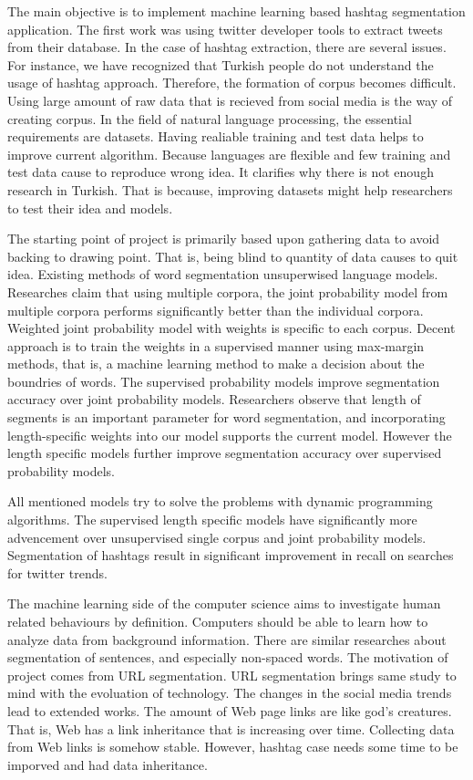 \documentclass[12pt]{comjnl}
\begin{document}
The main objective is to implement machine learning based hashtag segmentation application.
The first work was using twitter developer tools to 
extract tweets from their database. In the case of hashtag extraction, there are several issues. For instance,
we have recognized that Turkish people do not understand the usage of hashtag approach.
Therefore, the formation of corpus becomes difficult. Using large amount of raw data that 
is recieved from social media is the way of creating corpus. In the field of natural language 
processing, the essential requirements are datasets. Having realiable training and test data helps to improve
current algorithm. Because languages are flexible and few training and test data cause to 
reproduce wrong idea. It clarifies why there is not enough
research in Turkish. That is because, improving datasets might help researchers to test their idea and
models.

The starting point of project is primarily based upon gathering data to avoid
backing to drawing point. That is, being blind to quantity of data causes to quit idea.
Existing methods of word segmentation unsuperwised language models. Researches claim that
using multiple corpora, the joint probability model from multiple corpora performs significantly 
better than the individual corpora. Weighted joint probability model with weights is specific to each corpus. Decent approach is to train the weights in a supervised manner using max-margin methods, that is, a machine learning method to make a decision about the boundries of words.
The supervised probability models improve segmentation accuracy over joint probability models. 
Researchers observe that length of segments is an important parameter for word segmentation, and 
incorporating length-specific weights into our model supports the current model.
However the length specific models further improve segmentation accuracy over supervised 
probability models.

All mentioned models try to solve the problems with dynamic programming algorithms. The supervised length specific models have significantly more advencement over unsupervised single corpus and joint probability models. Segmentation of hashtags result in significant improvement in recall on searches for twitter trends.

The machine learning side of the computer science aims to investigate human related behaviours by definition. Computers should be able to learn how to analyze data from background information. There are similar researches about segmentation of sentences, and especially non-spaced words. The motivation of project comes from URL segmentation. URL segmentation brings same study to mind with the
evoluation of technology. The changes in the social media trends lead to extended works. The amount of Web page links are like god's creatures. That is, Web has a link inheritance that is increasing over time. Collecting data from Web links is somehow stable. However, hashtag case needs some time to be imporved and had data inheritance.
\end{document}
